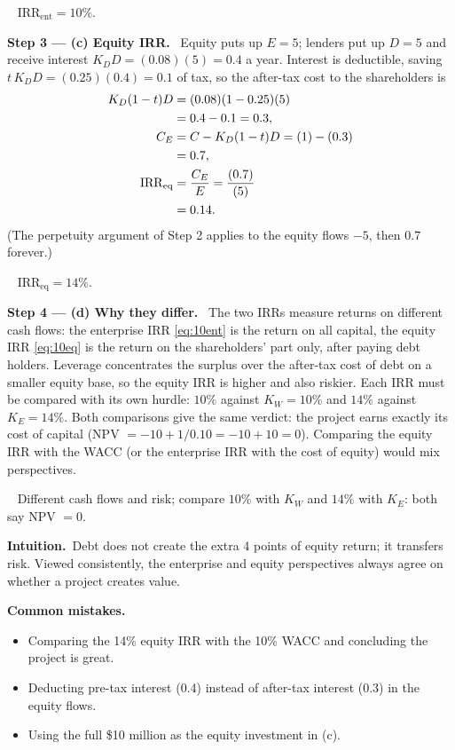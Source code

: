 \documentclass[11pt,a4paper]{article}
\numberwithin{equation}{section}
\newcommand{\step}[2]{\par\medskip\noindent\textbf{Step #1 --- #2.}~}
\newcommand{\intuition}[1]{\par\medskip\noindent\textbf{Intuition.}~#1}
\newcommand{\answer}[1]{\par\smallskip\noindent\fbox{\textbf{Answer #1.}}~}
\newcommand{\pitfalls}{\par\medskip\noindent\textbf{Common mistakes.}}
\begin{document}
\answer{(b)} $\mathrm{IRR}_{\mathrm{ent}}=10\%$.

\step{3}{(c) Equity IRR} Equity puts up $E=5$; lenders put up $D=5$ and receive interest
$K_DD=(0.08)(5)=0.4$ a year. Interest is deductible, saving $t\,K_DD=(0.25)(0.4)=0.1$ of tax, so
the after-tax cost to the shareholders is
\begin{align}
  K_D(1-t)D &= (0.08)(1-0.25)(5) \notag\\
            &= 0.4-0.1 = 0.3, \label{eq:10int}\\
  C_E &= C - K_D(1-t)D = (1) - (0.3) \notag\\
      &= 0.7, \label{eq:10ce}\\
  \mathrm{IRR}_{\mathrm{eq}} &= \frac{C_E}{E} = \frac{(0.7)}{(5)} \notag\\
                             &= 0.14. \label{eq:10eq}
\end{align}
(The perpetuity argument of Step 2 applies to the equity flows $-5$, then $0.7$ forever.)

\answer{(c)} $\mathrm{IRR}_{\mathrm{eq}}=14\%$.

\step{4}{(d) Why they differ} The two IRRs measure returns on different cash flows: the
enterprise IRR \eqref{eq:10ent} is the return on all capital, the equity IRR \eqref{eq:10eq} is
the return on the shareholders' part only, after paying debt holders. Leverage concentrates the
surplus over the after-tax cost of debt on a smaller equity base, so the equity IRR is higher
and also riskier. Each IRR must be compared with its own hurdle: $10\%$ against $K_W=10\%$ and
$14\%$ against $K_E=14\%$. Both comparisons give the same verdict: the project earns exactly
its cost of capital (NPV $=-10+1/0.10=-10+10=0$). Comparing the equity IRR with the WACC (or
the enterprise IRR with the cost of equity) would mix perspectives.

\answer{(d)} Different cash flows and risk; compare $10\%$ with $K_W$ and $14\%$ with $K_E$: both
say NPV $=0$.

\intuition{Debt does not create the extra 4 points of equity return; it transfers risk. Viewed
consistently, the enterprise and equity perspectives always agree on whether a project creates
value.}

\pitfalls
\begin{itemize}
  \item Comparing the 14\% equity IRR with the 10\% WACC and concluding the project is great.
  \item Deducting pre-tax interest (0.4) instead of after-tax interest (0.3) in the equity flows.
  \item Using the full \$10 million as the equity investment in (c).
\end{itemize}
\end{document}

